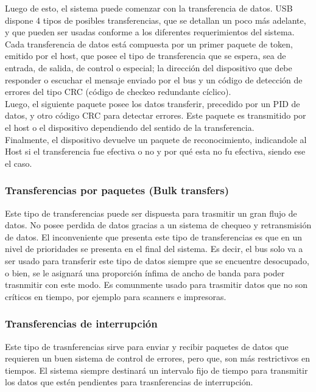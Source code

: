 	Luego de esto, el sistema puede comenzar con la transferencia de datos. USB dispone 4 tipos de posibles transferencias, que se detallan un poco más adelante, y que pueden ser usadas conforme a los diferentes requerimientos del sistema.\\
	
	Cada transferencia de datos está compuesta por un primer paquete de token, emitido por el host, que posee el tipo de transferencia que se espera, sea de entrada, de salida, de control o especial; la dirección del dispositivo que debe responder o escuchar el mensaje enviado por el bus y un código de detección de errores del tipo CRC (código de checkeo redundante cíclico).\\
	
	Luego, el siguiente paquete posee los datos transferir, precedido por un PID de datos, y otro código CRC para detectar errores. Este paquete es transmitido por el host o el dispositivo dependiendo del sentido de la transferencia.\\
	
	Finalmente, el dispositivo devuelve un paquete de reconocimiento, indicandole al Host si el transferencia fue efectiva o no y por qué esta no fu efectiva, siendo ese el caso.\\
	
	\subsubsection*{Transferencias por paquetes (Bulk transfers)}
		Este tipo de transferencias puede ser dispuesta para trasmitir un gran flujo de datos. No posee perdida de datos gracias a un sistema de chequeo y retransmisión de datos. El inconveniente que presenta este tipo de transferencias es que en un nivel de prioridades se presenta en el final del sistema. Es decir, el bus solo va a ser usado para transferir este tipo de datos siempre que se encuentre desocupado, o bien, se le asignará una proporción ínfima de ancho de banda para poder trasnmitir con este modo. Es comunmente usado para trasmitir datos que no son críticos en tiempo, por ejemplo para scanners e impresoras.\\
	
	\subsubsection*{Transferencias de interrupción}
		Este tipo de trasnferencias sirve para enviar y recibir paquetes de datos que requieren un buen sistema de control de errores, pero que, son más restrictivos en tiempos. El sistema siempre destinará un intervalo fijo de tiempo para transmitir los datos que estén pendientes para trasnferencias de interrupción.\\
	
